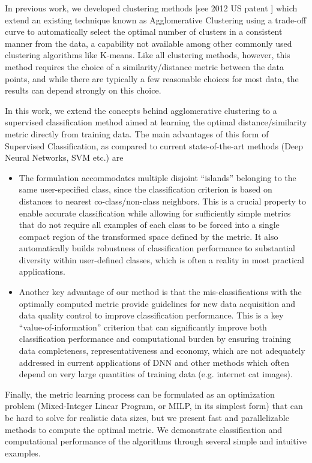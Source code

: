 \documentclass{article}
\begin{document}
In previous work, we developed clustering methods [see 2012 US patent \cite{KKpatent}] which  extend an existing 
technique known as Agglomerative Clustering using a trade-off curve to automatically select the optimal 
number of clusters in a consistent manner from the data, a capability not available among other commonly 
used clustering algorithms like K-means. Like all clustering methods, however, this method requires the 
choice of a similarity/distance metric between the data points, and while there are typically a few 
reasonable choices for most data, the results can depend strongly on this choice.

In this work, we extend the concepts behind agglomerative clustering to a supervised classification 
method aimed at learning the optimal distance/similarity metric directly from training data. The main advantages of
this form of Supervised Classification, as compared to current state-of-the-art methods (Deep Neural Networks, SVM etc.) are
\begin{itemize}
\item{The formulation accommodates multiple disjoint ``islands'' belonging to the same user-specified class, since
the classification criterion is based on distances to nearest co-class/non-class neighbors. This is a crucial property
to enable accurate classification while allowing for sufficiently simple metrics that do not require all examples of each
class to be forced into a single compact region of the transformed space defined by the metric. It also automatically builds
robustness of classification performance to substantial diversity within user-defined classes, which is often a reality in most practical applications.}
\item{Another key advantage of our method is that the mis-classifications with the optimally computed metric provide guidelines
for new data acquisition and data quality control to improve classification performance. This is a key ``value-of-information'' criterion that can significantly improve both classification performance and computational burden by ensuring training data completeness, representativeness and economy, which are not adequately addressed in current applications of DNN and other methods which often depend on
very large quantities of training data (e.g. internet cat images).}
\end{itemize}

Finally, the metric learning process can be formulated as an optimization problem (Mixed-Integer Linear Program, or MILP, 
in its simplest form) that can be hard to solve for realistic data sizes, but we present fast and parallelizable methods to compute the optimal metric.
We demonstrate classification and computational performance of the algorithms through several simple and intuitive examples.
\end{document}
